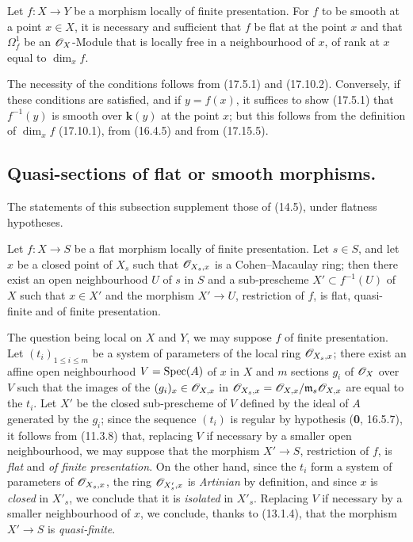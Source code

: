 \begin{proposition}[17.15.15]
\label{IV.17.15.15}
Let $f:X\to Y$ be a morphism locally of finite presentation. For $f$ to be smooth at a point $x\in X$, it is necessary and sufficient that $f$ be flat at the point $x$ and that $\varOmega^1_f$ be an $\mathscr{O}_X$-Module that is locally free in a neighbourhood of $x$, of rank at $x$ equal to $\dim_x f$.
\end{proposition}

The necessity of the conditions follows from (17.5.1) and (17.10.2). Conversely, if these conditions are satisfied, and if $y=f(x)$, it suffices to show (17.5.1) that $f^{-1}(y)$ is smooth over $\boldsymbol{k}(y)$ at the point $x$; but this follows from the definition of $\dim_x f$ (17.10.1), from (16.4.5) and from (17.15.5).

\subsection{Quasi-sections of flat or smooth morphisms.}

The statements of this subsection supplement those of (14.5), under flatness hypotheses.

\begin{proposition}[17.16.1]
\label{IV.17.16.1}
Let $f:X\to S$ be a flat morphism locally of finite presentation. Let $s\in S$, and let $x$ be a closed point of $X_s$ such that $\mathscr{O}_{X_s,x}$ is a Cohen--Macaulay ring; then there exist an open neighbourhood $U$ of $s$ in $S$ and a sub-prescheme $X'\subset f^{-1}(U)$ of $X$ such that $x\in X'$ and the morphism $X'\to U$, restriction of $f$, is flat, quasi-finite and of finite presentation.
\end{proposition}

The question being local on $X$ and $Y$, we may suppose $f$ of finite presentation. Let $(t_i)_{1\leq i\leq m}$ be a system of parameters of the local ring $\mathscr{O}_{X_s,x}$; there exist an affine open neighbourhood $V=\operatorname{Spec}(A)$ of $x$ in $X$ and $m$ sections $g_i$ of $\mathscr{O}_X$ over $V$ such that
the images of the $(g_i)_x\in\mathscr{O}_{X,x}$ in $\mathscr{O}_{X_s,x}=\mathscr{O}_{X,x}/\mathfrak m_s\mathscr{O}_{X,x}$ are equal to the $t_i$. Let $X'$ be the closed sub-prescheme of $V$ defined by the ideal of $A$ generated by the $g_i$; since the sequence $(t_i)$ is regular by hypothesis (\textbf{0}, 16.5.7), it follows from (11.3.8) that, replacing $V$ if necessary by a smaller open neighbourhood, we may suppose that the morphism $X'\to S$, restriction of $f$, is \emph{flat} and \emph{of finite presentation}. On the other hand, since the $t_i$ form a system of parameters of $\mathscr{O}_{X_s,x}$, the ring $\mathscr{O}_{X'_s,x}$ is \emph{Artinian} by definition, and since $x$ is \emph{closed} in $X'_s$, we conclude that it is \emph{isolated} in $X'_s$. Replacing $V$ if necessary by a smaller neighbourhood of $x$, we conclude, thanks to (13.1.4), that the morphism $X'\to S$ is \emph{quasi-finite}.

